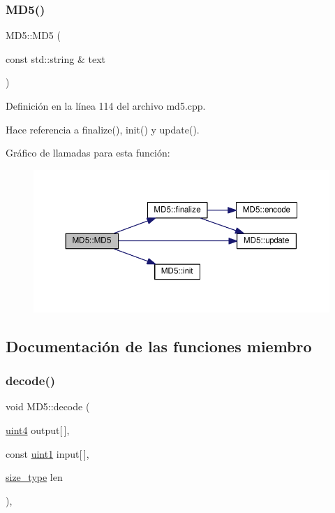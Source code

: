 \subsubsection{\texorpdfstring{M\+D5()}{MD5()}\hspace{0.1cm}{\footnotesize\ttfamily [2/2]}}
{\footnotesize\ttfamily M\+D5\+::\+M\+D5 (\begin{DoxyParamCaption}\item[{const std\+::string \&}]{text }\end{DoxyParamCaption})}



Definición en la línea 114 del archivo md5.\+cpp.



Hace referencia a finalize(), init() y update().

Gráfico de llamadas para esta función\+:\nopagebreak
\begin{figure}[H]
\begin{center}
\leavevmode
\includegraphics[width=350pt]{classMD5_a155356ffd713345e69e6dcbd9f8da6ce_cgraph}
\end{center}
\end{figure}


\subsection{Documentación de las funciones miembro}
\hypertarget{classMD5_a7eef3463c43a2cdfb56a0261b640f873}{}\label{classMD5_a7eef3463c43a2cdfb56a0261b640f873} 
\subsubsection{\texorpdfstring{decode()}{decode()}}
{\footnotesize\ttfamily void M\+D5\+::decode (\begin{DoxyParamCaption}\item[{\hyperlink{classMD5_a2e5b84a3d7db292f49873061214a0444}{uint4}}]{output\mbox{[}$\,$\mbox{]},  }\item[{const \hyperlink{classMD5_a3b1c4901139aef256ee49c4ab14d09f9}{uint1}}]{input\mbox{[}$\,$\mbox{]},  }\item[{\hyperlink{classMD5_aa836972700679dbcff6ae8337f6db464}{size\+\_\+type}}]{len }\end{DoxyParamCaption})\hspace{0.3cm}{\ttfamily [static]}, {\ttfamily [private]}}



